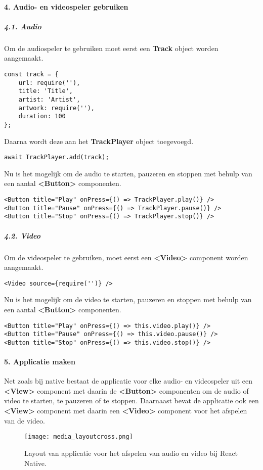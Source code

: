 \paragraph{4. Audio- en videospeler gebruiken}
\subparagraph{4.1. Audio}
Om de audiospeler te gebruiken moet eerst een \textbf{Track} object worden aangemaakt.
\begin{verbatim}
const track = {
    url: require(''),
    title: 'Title',
    artist: 'Artist',
    artwork: require(''),
    duration: 100
};
\end{verbatim}
Daarna wordt deze aan het \textbf{TrackPlayer} object toegevoegd.
\begin{verbatim}
await TrackPlayer.add(track);
\end{verbatim}
Nu is het mogelijk om de audio te starten, pauzeren en stoppen met behulp 
van een aantal \textbf{<Button>} componenten.
\begin{verbatim}
<Button title="Play" onPress={() => TrackPlayer.play()} />
<Button title="Pause" onPress={() => TrackPlayer.pause()} />
<Button title="Stop" onPress={() => TrackPlayer.stop()} />
\end{verbatim}

\subparagraph{4.2. Video}
Om de videospeler te gebruiken, moet eerst een \textbf{<Video>} component worden aangemaakt.
\begin{verbatim}
<Video source={require('')} />
\end{verbatim}
Nu is het mogelijk om de video te starten, pauzeren en stoppen met behulp
van een aantal \textbf{<Button>} componenten.
\begin{verbatim}
<Button title="Play" onPress={() => this.video.play()} />
<Button title="Pause" onPress={() => this.video.pause()} />
<Button title="Stop" onPress={() => this.video.stop()} />
\end{verbatim}

\paragraph{5. Applicatie maken}
Net zoals bij native bestaat de applicatie voor elke audio- en videospeler uit een \textbf{<View>}
component met daarin de \textbf{<Button>} componenten om de audio of video te starten, te pauzeren
of te stoppen. Daarnaast bevat de applicatie ook een \textbf{<View>} component met daarin een
\textbf{<Video>} component voor het afspelen van de video.
\begin{figure}[H]
    \centering
    \texttt{[image: media\_layoutcross.png]}
    \caption{Layout van applicatie voor het afspelen van audio en video bij React Native.}
\end{figure}


